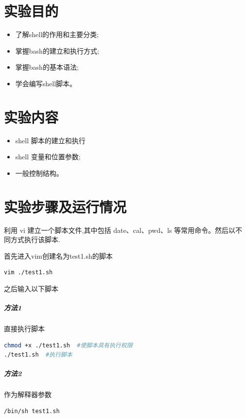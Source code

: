 \documentclass{JNUexp}
\begin{document}
 

\section{实验目的}
\begin{itemize}
    \item 了解shell的作用和主要分类;
    \item 掌握bash的建立和执行方式;
    \item 掌握bash的基本语法;
    \item 学会编写shell脚本。
\end{itemize}

\section{实验内容}
\begin{itemize}
    \item shell 脚本的建立和执行
    \item shell 变量和位置参数;
    \item 一般控制结构。
\end{itemize}
\section{实验步骤及运行情况}
\begin{problem}
    利用 vi 建立一个脚本文件,其中包括 date、cal、pwd、ls 等常用命令。然后以不同方式执行该脚本.
\end{problem}

\begin{answer}
    首先进入vim创建名为test1.sh的脚本
    \begin{lstlisting}[language=sh]
vim ./test1.sh
    \end{lstlisting}
    之后输入以下脚本
    
    \subparagraph{方法1} 直接执行脚本
        \begin{lstlisting}[language=sh]
chmod +x ./test1.sh  #使脚本具有执行权限
./test1.sh  #执行脚本
        \end{lstlisting}
    \subparagraph{方法2} 作为解释器参数
        \begin{lstlisting}[language=sh]
/bin/sh test1.sh
        \end{lstlisting}
\end{answer}
\end{document}
